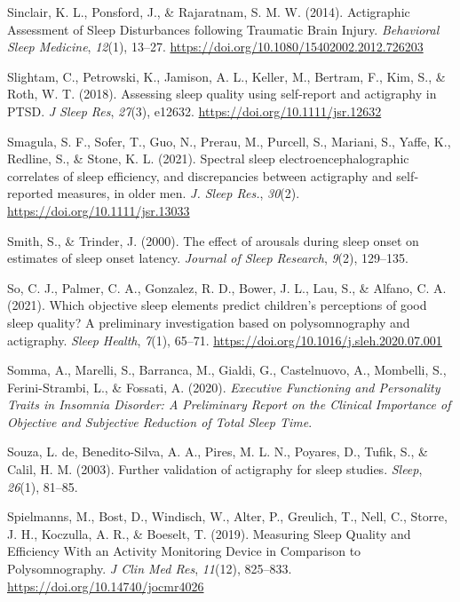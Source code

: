 \documentclass[
]{article}
\newlength{\cslhangindent}
\newenvironment{CSLReferences}[2] %
 {\begin{list}{}{%
  \setlength{\itemindent}{0pt}
  \setlength{\leftmargin}{0pt}
  \setlength{\parsep}{0pt}
  \ifodd #1
   \setlength{\leftmargin}{\cslhangindent}
   \setlength{\itemindent}{-1\cslhangindent}
  \fi
  \setlength{\itemsep}{#2\baselineskip}}}
 {\end{list}}
\begin{document}
\begin{CSLReferences}{1}{0}
Sinclair, K. L., Ponsford, J., \& Rajaratnam, S. M. W. (2014). Actigraphic {Assessment} of {Sleep} {Disturbances} following {Traumatic} {Brain} {Injury}. \emph{Behavioral Sleep Medicine}, \emph{12}(1), 13--27. \url{https://doi.org/10.1080/15402002.2012.726203}

Slightam, C., Petrowski, K., Jamison, A. L., Keller, M., Bertram, F., Kim, S., \& Roth, W. T. (2018). Assessing sleep quality using self-report and actigraphy in {PTSD}. \emph{J Sleep Res}, \emph{27}(3), e12632. \url{https://doi.org/10.1111/jsr.12632}

Smagula, S. F., Sofer, T., Guo, N., Prerau, M., Purcell, S., Mariani, S., Yaffe, K., Redline, S., \& Stone, K. L. (2021). Spectral sleep electroencephalographic correlates of sleep efficiency, and discrepancies between actigraphy and self‐reported measures, in older men. \emph{J. Sleep Res.}, \emph{30}(2). \url{https://doi.org/10.1111/jsr.13033}

Smith, S., \& Trinder, J. (2000). The effect of arousals during sleep onset on estimates of sleep onset latency. \emph{Journal of Sleep Research}, \emph{9}(2), 129--135.

So, C. J., Palmer, C. A., Gonzalez, R. D., Bower, J. L., Lau, S., \& Alfano, C. A. (2021). Which objective sleep elements predict children's perceptions of good sleep quality? {A} preliminary investigation based on polysomnography and actigraphy. \emph{Sleep Health}, \emph{7}(1), 65--71. \url{https://doi.org/10.1016/j.sleh.2020.07.001}

Somma, A., Marelli, S., Barranca, M., Gialdi, G., Castelnuovo, A., Mombelli, S., Ferini-Strambi, L., \& Fossati, A. (2020). \emph{Executive {Functioning} and {Personality} {Traits} in {Insomnia} {Disorder}: {A} {Preliminary} {Report} on the {Clinical} {Importance} of {Objective} and {Subjective} {Reduction} of {Total} {Sleep} {Time}}.

Souza, L. de, Benedito-Silva, A. A., Pires, M. L. N., Poyares, D., Tufik, S., \& Calil, H. M. (2003). Further validation of actigraphy for sleep studies. \emph{Sleep}, \emph{26}(1), 81--85.

Spielmanns, M., Bost, D., Windisch, W., Alter, P., Greulich, T., Nell, C., Storre, J. H., Koczulla, A. R., \& Boeselt, T. (2019). Measuring {Sleep} {Quality} and {Efficiency} {With} an {Activity} {Monitoring} {Device} in {Comparison} to {Polysomnography}. \emph{J Clin Med Res}, \emph{11}(12), 825--833. \url{https://doi.org/10.14740/jocmr4026}


\end{CSLReferences}
\end{document}

